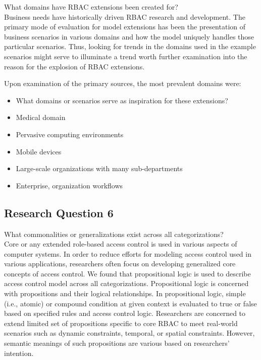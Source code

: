 What domains have RBAC extensions been created for? \\

Business needs have historically driven RBAC research and development.  The primary mode of evaluation for
model extensions has been the presentation of business scenarios in various domains and how the model
uniquely handles those particular scenarios.  Thus, looking for trends in the domains used in the example
scenarios might serve to illuminate a trend worth further examination into the reason for the explosion of
RBAC extensions.

Upon examination of the primary sources, the most prevalent domains were:

\begin{itemize}
\item What domains or scenarios serve as inspiration for these extensions?
\item Medical domain
\item Pervasive computing environments
\item Mobile devices
\item Large-scale organizations with many sub-departments
\item Enterprise, organization workflows
\end{itemize}

\subsection{Research Question 6}

What commonalities or generalizations exist across all categorizations? \\

Core or any extended role-based access control is used in various aspects of computer systems. In order to reduce efforts for modeling access control used in various applications, researchers often focus on developing generalized core concepts of access control.
We found that propositional logic is used to describe access control model across all categorizations. Propositional logic is concerned with propositions and their logical relationships. In propositional logic, simple (i.e., atomic) or compound condition at given context is evaluated to true or false based on specified rules and access control logic. Researchers are concerned to extend limited set of propositions specific to core RBAC to meet real-world scenarios such as dynamic constraints, temporal, or spatial constraints. However, semantic meanings of such propositions are various based on researchers' intention.

